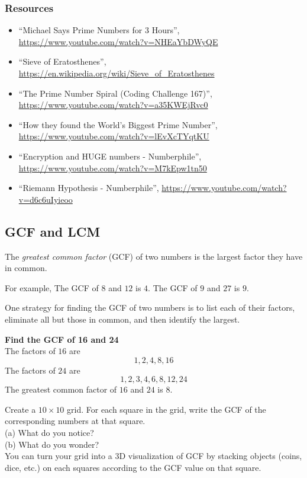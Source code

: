 \subsubsection{Resources}
\begin{itemize}
	\item {\footnotesize ``Michael Says Prime Numbers for 3 Hours'', \url{https://www.youtube.com/watch?v=NHEaYbDWyQE}}
	\item {\footnotesize ``Sieve of Eratosthenes'', \url{https://en.wikipedia.org/wiki/Sieve_of_Eratosthenes}}
	\item {\footnotesize ``The Prime Number Spiral (Coding Challenge 167)'', \url{https://www.youtube.com/watch?v=a35KWEjRvc0}}
	\item {\footnotesize ``How they found the World's Biggest Prime Number'', \url{https://www.youtube.com/watch?v=lEvXcTYqtKU}}
	\item {\footnotesize ``Encryption and HUGE numbers - Numberphile'', \url{https://www.youtube.com/watch?v=M7kEpw1tn50}}
	\item {\footnotesize ``Riemann Hypothesis - Numberphile'', \url{https://www.youtube.com/watch?v=d6c6uIyieoo}}
\end{itemize}

\newpage 
\subsection{GCF and LCM}

\begin{definition} 
The \emph{greatest common factor} (GCF) of two numbers is the largest factor they have in common.  

For example, The GCF of \(8\) and \(12\) is \(4\). The GCF of \(9\) and \(27\) is \(9\).  
\end{definition}
One strategy for finding the GCF of two numbers is to list each of their factors, eliminate all but those in common, and then identify the largest.  
\begin{example}\textbf{Find the GCF of 16 and 24}
\\ 
The factors of \(16\) are 
\[1,2, 4, 8, 16\]
The factors of \(24\) are 
\[ 1, 2, 3, 4, 6, 8, 12, 24 \]
The greatest common factor of \(16\) and \(24\) is \(8\). 
\end{example}
\begin{exercise}
Create a \(10 \times 10\) grid.  For each square in the grid, write the GCF of the corresponding numbers at that square.  
	\\ \hspace*{15mm}(a) What do you notice?
	\\ \hspace*{15mm}(b) What do you wonder? 
\\
You can turn your grid into a 3D visualization of GCF by stacking objects (coins, dice, etc.) on each squares according to the GCF value on that square. 
\label{ex:gcdgrid}
\end{exercise}


